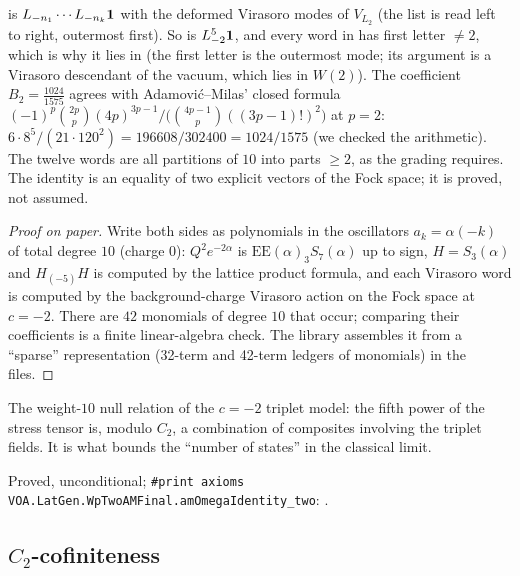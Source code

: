 \begin{dictionary}
 is $L_{-n_1}\cdots L_{-n_k}\mathbf{1}$ with the deformed Virasoro modes of
$V_{L_2}$ (the list is read left to right, outermost first). So  is
$L_{-2}^5\mathbf{1}$, and every word in  has first letter $\ne2$, which is why it lies in
 (the first letter is the outermost mode; its argument is a Virasoro descendant of the
vacuum, which lies in $W(2)$). The coefficient $B_2=\frac{1024}{1575}$ agrees with Adamovi\'c--Milas'
closed formula $(-1)^p\binom{2p}{p}(4p)^{3p-1}/\bigl(\binom{4p-1}{p}((3p-1)!)^2\bigr)$ at $p=2$:
$6\cdot8^5/(21\cdot120^2)=196608/302400=1024/1575$ (we checked the arithmetic). The twelve words are all
partitions of $10$ into parts $\ge2$, as the grading requires. The identity is an equality of two explicit
vectors of the Fock space; it is proved, not assumed.
\end{dictionary}
\begin{proof}[Proof on paper]
Write both sides as polynomials in the oscillators $a_k=\alpha(-k)$ of total degree $10$ (charge $0$):
$Q^2e^{-2\alpha}$ is $\mathrm{EE}(\alpha)_3S_7(\alpha)$ up to sign, $H=S_3(\alpha)$ and $H_{(-5)}H$ is computed by
the lattice product formula, and each Virasoro word is computed by the background-charge Virasoro action on
the Fock space at $c=-2$. There are $42$ monomials of degree $10$ that occur; comparing their coefficients
is a finite linear-algebra check. The library assembles it from a ``sparse'' representation (32-term and
42-term ledgers of monomials) in the  files.
\end{proof}
\begin{physics}
The weight-$10$ null relation of the $c=-2$ triplet model: the fifth power of the stress tensor is,
modulo $C_2$, a combination of composites involving the triplet fields. It is what bounds the ``number of
states'' in the classical limit.
\end{physics}
\begin{status}
Proved, unconditional; \texttt{\#print axioms VOA.LatGen.WpTwoAMFinal.amOmegaIdentity\_two}:
.
\end{status}

\subsection{\texorpdfstring{$C_2$}{C2}-cofiniteness}

